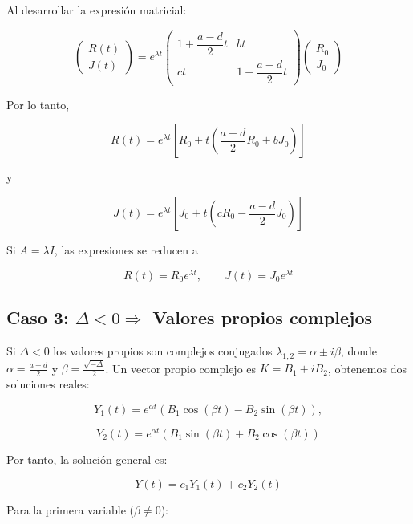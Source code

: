 \documentclass[10pt]{article}
\numberwithin{equation}{section}
\begin{document}
Al desarrollar la expresión matricial:

\[
\begin{pmatrix}
R(t)\\
J(t)
\end{pmatrix}
=
e^{\lambda t}
\begin{pmatrix}
1+\dfrac{a-d}{2}t&bt\\[4pt]
ct&1-\dfrac{a-d}{2}t
\end{pmatrix}
\begin{pmatrix}
R_0\\
J_0
\end{pmatrix}
\]

Por lo tanto,

\[
\boxed{
R(t)=e^{\lambda t}
\left[
R_0+t\left(
\frac{a-d}{2}R_0+bJ_0
\right)
\right]
}
\]

y

\[
\boxed{
J(t)=e^{\lambda t}
\left[
J_0+t\left(
cR_0-\frac{a-d}{2}J_0
\right)
\right]
}
\]

Si $A=\lambda I$, las expresiones se reducen a

\[
R(t)=R_0e^{\lambda t},
\qquad
J(t)=J_0e^{\lambda t}
\]
\subsection{Caso 3: $\Delta < 0 \Rightarrow$ Valores propios complejos}

Si $\Delta<0$ los valores propios son complejos conjugados $\lambda_{1,2}=\alpha\pm i\beta$, donde
$\alpha=\frac{a+d}{2}$ y $\beta=\frac{\sqrt{-\Delta}}{2}$.
Un vector propio complejo es $K = B_1 + iB_2$, obtenemos dos soluciones reales:

\begin{equation}
Y_1(t)=e^{\alpha t}
(B_1\cos(\beta t)-B_2\sin(\beta t)),
\end{equation}

\begin{equation}
Y_2(t)=e^{\alpha t}
(B_1\sin(\beta t)+B_2\cos(\beta t))
\end{equation}

Por tanto, la solución general es:

\begin{equation}
Y(t)=c_1Y_1(t)+c_2Y_2(t)
\end{equation}

Para la primera variable ($\beta \neq 0$):
\end{document}
